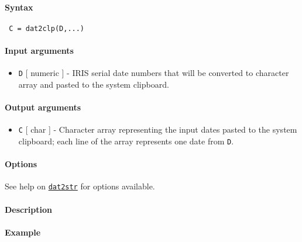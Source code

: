 


	\paragraph{Syntax}
 
 \begin{verbatim}
 C = dat2clp(D,...)
 \end{verbatim}
 
 \paragraph{Input arguments}
 
 \begin{itemize}
 \item
   \texttt{D} {[} numeric {]} - IRIS serial date numbers that will be
   converted to character array and pasted to the system clipboard.
 \end{itemize}
 
 \paragraph{Output arguments}
 
 \begin{itemize}
 \item
   \texttt{C} {[} char {]} - Character array representing the input dates
   pasted to the system clipboard; each line of the array represents one
   date from \texttt{D}.
 \end{itemize}
 
 \paragraph{Options}
 
 See help on \href{dates/dat2str}{\texttt{dat2str}} for options
 available.
 
 \paragraph{Description}
 
 \paragraph{Example}


